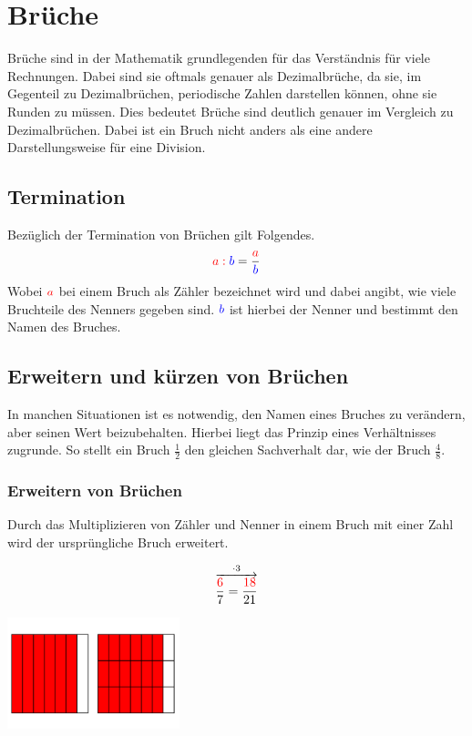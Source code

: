 \section{Brüche}\label{sec:Brueche}
Brüche sind in der Mathematik grundlegenden für das Verständnis für viele Rechnungen. Dabei sind sie oftmals genauer als Dezimalbrüche, da sie, im Gegenteil zu Dezimalbrüchen, periodische Zahlen darstellen können, ohne sie Runden zu müssen. Dies bedeutet Brüche sind deutlich genauer im Vergleich zu Dezimalbrüchen. Dabei ist ein Bruch nicht anders als eine andere Darstellungsweise für eine Division.
\subsection{Termination}\label{sec:Brueche/Termination}
 Bezüglich der Termination von Brüchen gilt Folgendes.\\
\[\color{red}a:\color{blue}b\color{black}= \frac{\color{red}a}{\color{blue}b}\]
Wobei $\color{red}{a}$ bei einem Bruch als Zähler bezeichnet wird und dabei angibt, wie viele Bruchteile des Nenners gegeben sind.  $\color{blue}{b}$ ist hierbei der Nenner und bestimmt den Namen des Bruches.
\subsection{Erweitern und kürzen von Brüchen}\label{sec:Brueche/Erweitern und kuerzen von Bruechen}
In manchen Situationen ist es notwendig, den Namen eines Bruches zu verändern, aber seinen Wert beizubehalten. Hierbei liegt das Prinzip eines Verhältnisses zugrunde. So stellt ein Bruch $\frac{1}{2}$ den gleichen Sachverhalt dar, wie der Bruch $\frac{4}{8}$.
\subsubsection{Erweitern von Brüchen} Durch das Multiplizieren von Zähler und Nenner in einem Bruch mit einer Zahl wird der ursprüngliche Bruch erweitert. 
\begin{paracol}{2}
	\begin{flushleft}
	\begin{beispiel}
\[\overset{\cdot3}{\overrightarrow{\frac{\color{red}6}{7}=\frac{\color{red}18}{21}}}\]
	\end{beispiel}
	\end{flushleft}	
\switchcolumn
	\begin{flushright}
		\includegraphics[width=5cm]{Media/Theorieheft-Brueche-Erweitern.png}
	\end{flushright}
\end{paracol}
